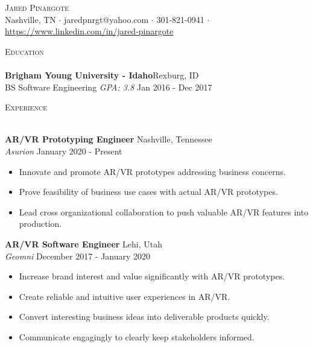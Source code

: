 \documentclass[a4paper]{article}
\newcommand{\lineunder} {
    \vspace*{-8pt} \\
    \hspace*{-18pt} \hrulefill \\
}
\newcommand{\header} [1] {
    {\hspace*{-18pt}\vspace*{6pt} \textsc{#1}}
    \vspace*{-6pt} \lineunder
}
\begin{document}
\vspace*{-40pt}

    

\vspace*{-10pt}
\begin{center}
	{\Huge \scshape {Jared Pinargote}}\\
	Nashville, TN $\cdot$ jaredpnrgt@yahoo.com $\cdot$ 301-821-0941 $\cdot$ \href{https://www.linkedin.com/in/jared-pinargote}{https://www.linkedin.com/in/jared-pinargote}
\end{center}

\header{Education}
\textbf{Brigham Young University - Idaho}\hfill Rexburg, ID\\
BS Software Engineering \textit{GPA: 3.8} \hfill Jan 2016 - Dec 2017\\
\vspace{2mm}

\header{Experience}
\vspace{1mm}

\textbf{AR/VR Prototyping Engineer} \hfill Nashville, Tennessee\\
\textit{Asurion} \hfill January 2020 - Present\\
\vspace{-3mm}
\begin{itemize} \itemsep 1pt
	\item Innovate and promote AR/VR prototypes addressing business concerns.
	\item Prove feasibility of business use cases with actual AR/VR prototypes.
	\item Lead cross organizational collaboration to push valuable AR/VR features into production.
\end{itemize}

\textbf{AR/VR Software Engineer} \hfill Lehi, Utah\\
\textit{Geomni} \hfill December 2017 - January 2020\\
\vspace{-3mm}
\begin{itemize} \itemsep 1pt
	\item Increase brand interest and value significantly with AR/VR prototypes.
	\item Create reliable and intuitive user experiences in AR/VR.
	\item Convert interesting business ideas into deliverable products quickly.
	\item Communicate engagingly to clearly keep stakeholders informed.
\end{itemize}
\end{document}
